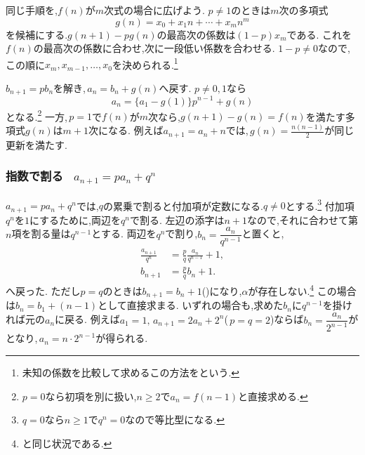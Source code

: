     同じ手順を,$f(n)$が$m$次式の場合に広げよう.
    $p\ne1$のときは$m$次の多項式
    \[
      g(n)=x_0+x_1n+\cdots+x_mn^m
    \]
    を候補にする.$g(n+1)-pg(n)$の最高次の係数は$(1-p)x_m$である.
    これを$f(n)$の最高次の係数に合わせ,次に一段低い係数を合わせる.
    $1-p\ne0$なので,この順に$x_m,x_{m-1},\ldots,x_0$を決められる.\footnote{未知の係数を比較して求めるこの方法をという.}

    $b_{n+1}=pb_n$を解き,\,$a_n=b_n+g(n)$へ戻す.
    $p\ne0,1$なら
    \[
      a_n=\{a_1-g(1)\}p^{n-1}+g(n)
    \]
    となる.\footnote{$p=0$なら初項を別に扱い,$n\ge2$で$a_n=f(n-1)$と直接求める.}
    一方,\,$p=1$で$f(n)$が$m$次なら,$g(n+1)-g(n)=f(n)$を満たす多項式$g(n)$は$m+1$次になる.
    例えば$a_{n+1}=a_n+n$では,\,$g(n)=\frac{n(n-1)}2$が同じ更新を満たす.

  \subsubsection{\texorpdfstring{指数で割る  \, $\displaystyle a_{n+1}=pa_n+q^n$}{指数で割る}}
    $a_{n+1}=pa_n+q^n$では,$q$の累乗で割ると付加項が定数になる.$q\ne0$とする.\footnote{$q=0$なら$n\ge1$で$q^n=0$なので等比型になる.}
    付加項$q^n$を$1$にするために,両辺を$q^n$で割る.
    左辺の添字は$n+1$なので,それに合わせて第$n$項を割る量は$q^{n-1}$とする.
    両辺を$q^n$で割り,$b_n=\dfrac{a_n}{q^{n-1}}$と置くと,
    \[
      \begin{aligned}
        \frac{a_{n+1}}{q^n}&=\frac pq\frac{a_n}{q^{n-1}}+1,\\
        b_{n+1}&=\frac pq b_n+1.
      \end{aligned}
    \]
    へ戻った.
    ただし$p=q$のときは$b_{n+1}=b_n+1$()になり,$\alpha$が存在しない.\footnote{と同じ状況である.}
    この場合は$b_n=b_1+(n-1)$として直接求まる.
    いずれの場合も,求めた$b_n$に$q^{n-1}$を掛ければ元の$a_n$に戻る.
    例えば$a_1=1,\,a_{n+1}=2a_n+2^n$(\,$p=q=2$)ならば$b_n=\dfrac{a_n}{2^{n-1}}$がとなり,\,$a_n=n\cdot2^{n-1}$が得られる.
